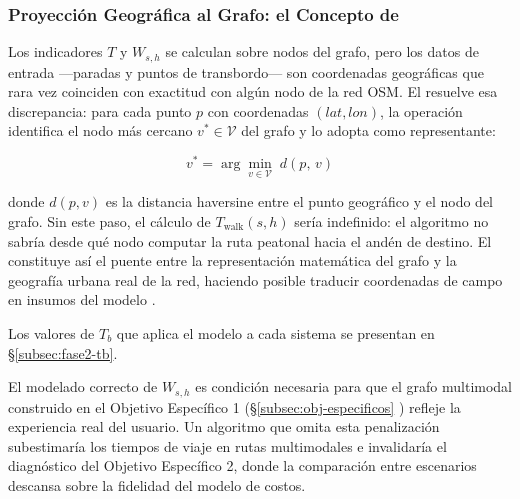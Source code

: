 \subsubsection{Proyección Geográfica al Grafo: el Concepto de }
\label{subsubsec:snapping}

Los indicadores $T$ y $W_{s,h}$ se calculan sobre nodos del grafo, pero los
datos de entrada ---paradas \gtfs{} y puntos de transbordo--- son coordenadas
geográficas que rara vez coinciden con exactitud con algún nodo de la red OSM.
El  resuelve esa discrepancia: para cada punto $p$ con
coordenadas $(lat, lon)$, la operación identifica el nodo más cercano
$v^* \in \mathcal{V}$ del grafo y lo adopta como representante:

\begin{equation}
    v^* = \arg\min_{v \in \mathcal{V}}\; d\!\left(p,\, v\right)
    \label{eq:snapping}
\end{equation}

donde $d(p, v)$ es la distancia haversine entre el punto geográfico y el nodo
del grafo. Sin este paso, el cálculo de $T_{\text{walk}}(s, h)$ sería
indefinido: el algoritmo no sabría desde qué nodo computar la ruta peatonal
hacia el andén de destino. El  constituye así el puente entre
la representación matemática del grafo y la geografía urbana real de la red,
haciendo posible traducir coordenadas de campo en insumos del modelo
\citep{fortin2016innovative}.

Los valores de $T_b$ que aplica el modelo a cada sistema se presentan en
§\ref{subsec:fase2-tb}.


El modelado correcto de $W_{s,h}$ es condición necesaria para que el grafo
multimodal construido en el Objetivo Específico 1
(§\ref{subsec:obj-especificos} ) refleje la experiencia real del usuario. Un
algoritmo que omita esta penalización subestimaría los tiempos de viaje en rutas
multimodales e invalidaría el diagnóstico del Objetivo Específico 2, donde la
comparación entre escenarios descansa sobre la fidelidad del modelo de costos.

